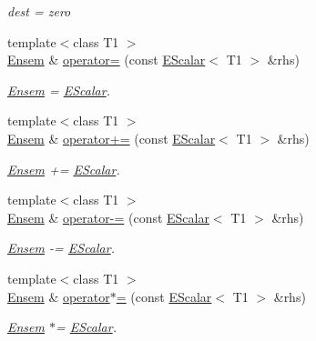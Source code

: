 \begin{DoxyCompactItemize}
\begin{DoxyCompactList}\small\item\em dest = zero \end{DoxyCompactList}\item 
{\footnotesize template$<$class T1 $>$ }\\\mbox{\hyperlink{classENSEM_1_1Ensem}{Ensem}} \& \mbox{\hyperlink{classENSEM_1_1Ensem_a376ab0239198595a09384c13d7a1ad1c}{operator=}} (const \mbox{\hyperlink{classENSEM_1_1EScalar}{E\+Scalar}}$<$ T1 $>$ \&rhs)
\begin{DoxyCompactList}\small\item\em \mbox{\hyperlink{classENSEM_1_1Ensem}{Ensem}} = \mbox{\hyperlink{classENSEM_1_1EScalar}{E\+Scalar}}. \end{DoxyCompactList}\item 
{\footnotesize template$<$class T1 $>$ }\\\mbox{\hyperlink{classENSEM_1_1Ensem}{Ensem}} \& \mbox{\hyperlink{classENSEM_1_1Ensem_a3b36653814508e90b22543a3f1b465d5}{operator+=}} (const \mbox{\hyperlink{classENSEM_1_1EScalar}{E\+Scalar}}$<$ T1 $>$ \&rhs)
\begin{DoxyCompactList}\small\item\em \mbox{\hyperlink{classENSEM_1_1Ensem}{Ensem}} += \mbox{\hyperlink{classENSEM_1_1EScalar}{E\+Scalar}}. \end{DoxyCompactList}\item 
{\footnotesize template$<$class T1 $>$ }\\\mbox{\hyperlink{classENSEM_1_1Ensem}{Ensem}} \& \mbox{\hyperlink{classENSEM_1_1Ensem_a33710df08404883ee7790d2b67542971}{operator-\/=}} (const \mbox{\hyperlink{classENSEM_1_1EScalar}{E\+Scalar}}$<$ T1 $>$ \&rhs)
\begin{DoxyCompactList}\small\item\em \mbox{\hyperlink{classENSEM_1_1Ensem}{Ensem}} -\/= \mbox{\hyperlink{classENSEM_1_1EScalar}{E\+Scalar}}. \end{DoxyCompactList}\item 
{\footnotesize template$<$class T1 $>$ }\\\mbox{\hyperlink{classENSEM_1_1Ensem}{Ensem}} \& \mbox{\hyperlink{classENSEM_1_1Ensem_abacb93dfca393ddb29f317d35e2fff7f}{operator$\ast$=}} (const \mbox{\hyperlink{classENSEM_1_1EScalar}{E\+Scalar}}$<$ T1 $>$ \&rhs)
\begin{DoxyCompactList}\small\item\em \mbox{\hyperlink{classENSEM_1_1Ensem}{Ensem}} $\ast$= \mbox{\hyperlink{classENSEM_1_1EScalar}{E\+Scalar}}. \end{DoxyCompactList}\item 

\end{DoxyCompactItemize}
